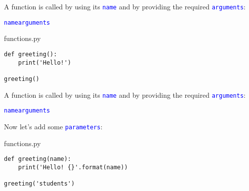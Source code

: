 \documentclass[aspectratio=1610,slidestop]{beamer}
\newcommand{\decl}[1]{\textcolor{blue}{\lstinline{#1}}}
\begin{document}
\begin{pframe}
 A function is called by using its \decl{name} and by providing the required
 \decl{arguments}:
 \begin{pythondeclaration}
  \decl{name}\emp{(}\decl{arguments}\emp{)}
 \end{pythondeclaration}
 \vspace{0.1cm}
 \begin{minipage}[t]{0.47\textwidth}
  \begin{pythonfile}{functions.py}
   \begin{verbatim}
def greeting():
    print('Hello!')

greeting()
   \end{verbatim}
  \end{pythonfile}
 \end{minipage}\qquad
 \begin{minipage}[t]{0.47\textwidth}
 \vspace{-2.55cm}
 \begin{terminal}
 \end{terminal}
 \end{minipage}
\end{pframe}


\begin{pframe}
 A function is called by using its \decl{name} and by providing the required
 \decl{arguments}:
 \begin{pythondeclaration}
  \decl{name}\emp{(}\decl{arguments}\emp{)}
 \end{pythondeclaration}
 Now let's add some \decl{parameters}:
 \vspace{0.1cm}

 \begin{minipage}[t]{0.49\textwidth}
  \begin{pythonfile}{functions.py}
   \begin{verbatim}
def greeting(name):
    print('Hello! {}'.format(name))

greeting('students')
   \end{verbatim}
  \end{pythonfile}
 \end{minipage}\qquad
 \begin{minipage}[t]{0.47\textwidth}
 \vspace{-2.55cm}
 \begin{terminal}
 \end{terminal}
 \end{minipage}
\end{pframe}
\end{document}
